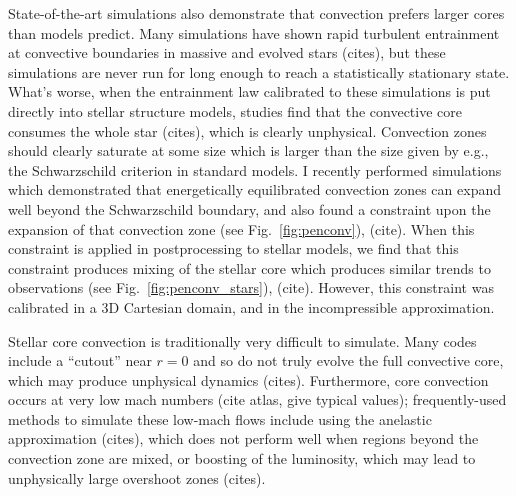 \documentclass[12pt]{article}
\begin{document}
State-of-the-art simulations also demonstrate that convection prefers larger cores than models predict.
Many simulations have shown rapid turbulent entrainment at convective boundaries in massive and evolved stars (cites), but these simulations are never run for long enough to reach a statistically stationary state.
What's worse, when the entrainment law calibrated to these simulations is put directly into stellar structure models, studies find that the convective core consumes the whole star (cites), which is clearly unphysical.
Convection zones should clearly saturate at some size which is larger than the size given by e.g., the Schwarzschild criterion in standard models.
I recently performed simulations which demonstrated that energetically equilibrated convection zones can expand well beyond the Schwarzschild boundary, and also found a constraint upon the expansion of that convection zone (see Fig.~\ref{fig:penconv}), (cite).
When this constraint is applied in postprocessing to stellar models, we find that this constraint produces mixing of the stellar core which produces similar trends to observations (see Fig.~\ref{fig:penconv_stars}), (cite).
However, this constraint was calibrated in a 3D Cartesian domain, and in the incompressible approximation.

Stellar core convection is traditionally very difficult to simulate.
Many codes include a ``cutout'' near $r = 0$ and so do not truly evolve the full convective core, which may produce unphysical dynamics (cites).
Furthermore, core convection occurs at very low mach numbers (cite atlas, give typical values); frequently-used methods to simulate these low-mach flows include using the anelastic approximation (cites), which does not perform well when regions beyond the convection zone are mixed, or boosting of the luminosity, which may lead to unphysically large overshoot zones (cites).
\end{document}
